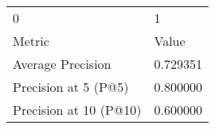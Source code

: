 \begin{tabular}{ll}
0 & 1 \\
Metric & Value \\
Average Precision & 0.729351 \\
Precision at 5 (P@5) & 0.800000 \\
Precision at 10 (P@10) & 0.600000 \\
\end{tabular}
